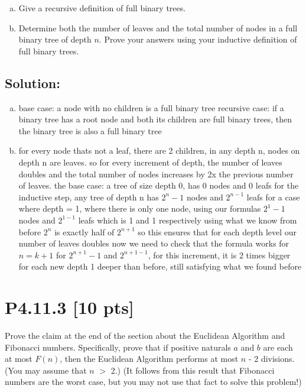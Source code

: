 \documentclass[12pt]{article}
\begin{document}
\begin{enumerate}[(a)]
    \item Give a recursive definition of full binary trees.

    \item  Determine both the number of leaves and the total number of nodes in a full binary tree of depth $n$. Prove your answers using your inductive definition of full binary trees.
    
\end{enumerate}


\subsection*{\textbf{Solution:}}
\begin{enumerate}[(a)]
    \item base case: a node with no children is a full binary tree \newline recursive case: if a binary tree has a root node and both its children are full binary trees, then the binary tree is also a full binary tree

    \item for every node thats not a leaf, there are 2 children, in any depth n, nodes on depth n are leaves. so for every increment of depth, the number of leaves doubles and the total number of nodes increases by 2x the previous number of leaves. 
    \newline the base case: a tree of size depth 0, has 0 nodes and 0 leafs
    \newline for the inductive step, any tree of depth n has $2^n-1$ nodes and $2^{n-1}$ leafs
    \newline for a case where depth = 1, where there is only one node, using our formulas $2^1-1$ nodes and $2^{1-1}$ leafs which is 1 and 1 respectively
    \newline using what we know from before $2^n$ is exactly half of $2^{n+1}$ so this ensures that for each depth level our number of leaves doubles
    \newline now we need to check that the formula works for $n=k+1$ for $2^{n+1}-1$ and $2^{n+1-1}$, for this increment, it is 2 times bigger for each new depth 1 deeper than before, still satisfying what we found before
    
\end{enumerate}

\newpage
\section*{\textbf{P4.11.3} [10 pts]}
 Prove the claim at the end of the section about the Euclidean Algorithm and Fibonacci numbers. Specifically, prove that if positive naturals $a$ and $b$ are each at most $F(n)$, then the Euclidean Algorithm performs at most $n$ - 2 divisions. (You may assume that $n$ $>$ 2.) (It follows from this result that Fibonacci numbers are the worst case, but you may not use that fact to solve this problem!)
\end{document}
